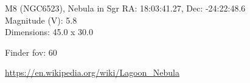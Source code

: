 \begin{block}{M8 (NGC6523), Nebula in Sgr}
    RA: 18:03:41.27, Dec: -24:22:48.6 \\ 
    Magnitude (V): 5.8 \\ 
    Dimensions: 45.0 x 30.0 

    Finder fov: 60 

    \url{https://en.wikipedia.org/wiki/Lagoon_Nebula} 
\end{block}
